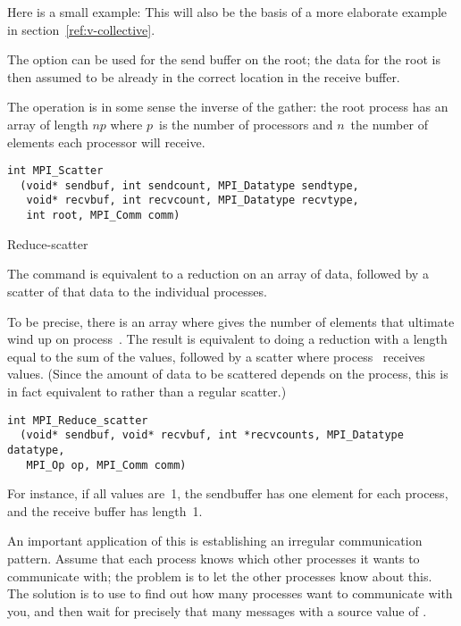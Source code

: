 Here is a small example:
This will also be the basis of a more elaborate example in
section~\ref{ref:v-collective}.

The  option can be used for the send buffer on the root;
the data for the root is then assumed to be already in the correct location
in the receive buffer.

The  operation is in some sense the inverse of the gather:
the root process has an array of length $np$ where $p$~is the number of processors
and $n$~the number of elements each processor will receive.
\begin{verbatim}
int MPI_Scatter
  (void* sendbuf, int sendcount, MPI_Datatype sendtype, 
   void* recvbuf, int recvcount, MPI_Datatype recvtype, 
   int root, MPI_Comm comm) 
\end{verbatim}

 {Reduce-scatter}

The  command is equivalent to a reduction
on an array of data, followed by a scatter of that data to the individual processes.

To be precise, there is an array  where  gives
the number of elements that ultimate wind up on process~.
The result is equivalent to doing a reduction with a length equal to the sum
of the  values, followed by a scatter where process~
receives  values. (Since the amount of data to be scattered
depends on the process, this is in fact equivalent to 
rather than a regular scatter.)
\begin{verbatim}
int MPI_Reduce_scatter
  (void* sendbuf, void* recvbuf, int *recvcounts, MPI_Datatype datatype, 
   MPI_Op op, MPI_Comm comm)
\end{verbatim}
For instance, if all  values are~1, the sendbuffer has one element
for each process, and the receive buffer has length~1.

An important application of this is establishing an irregular
communication pattern.  Assume that each process knows which
other processes it wants to communicate with; the problem is to
let the other processes know about this.
The solution is to use  to find out how many processes
want to communicate with you, and then wait for precisely that many messages
with a source value of .

